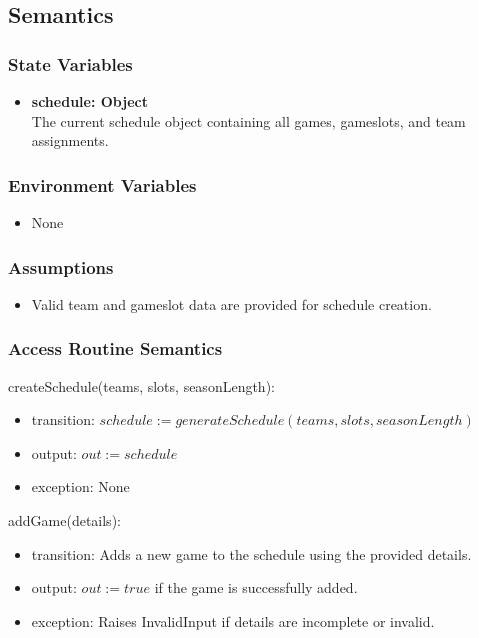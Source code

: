 \documentclass[12pt, titlepage]{article}
\begin{document}
\subsection{Semantics}

\subsubsection{State Variables}
\begin{itemize}
    \item \textbf{schedule: Object} \\ The current schedule object containing all games, gameslots, and team assignments.
\end{itemize}

\subsubsection{Environment Variables}
\begin{itemize}
    \item None
\end{itemize}

\subsubsection{Assumptions}
\begin{itemize}
    \item Valid team and gameslot data are provided for schedule creation.
\end{itemize}

\subsubsection{Access Routine Semantics}

\noindent createSchedule(teams, slots, seasonLength):
\begin{itemize}
    \item transition: $schedule := generateSchedule(teams, slots, seasonLength)$
    \item output: $out := schedule$
    \item exception: None
\end{itemize}

\noindent addGame(details):
\begin{itemize}
    \item transition: Adds a new game to the schedule using the provided details.
    \item output: $out := true$ if the game is successfully added.
    \item exception: Raises InvalidInput if details are incomplete or invalid.
\end{itemize}
\end{document}
